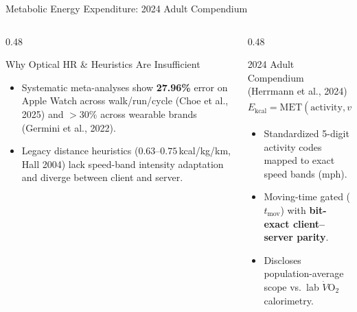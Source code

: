 \documentclass[aspectratio=169,10pt]{beamer}
\begin{document}
\begin{frame}{Metabolic Energy Expenditure: 2024 Adult Compendium}
  \begin{columns}[T]
    \begin{column}{0.48\textwidth}
      \begin{alertblock}{Why Optical HR \& Heuristics Are Insufficient}
        \begin{itemize}\small
          \item Systematic meta-analyses show \textbf{27.96\%} error on Apple Watch across walk/run/cycle (Choe et al., 2025) and \textbf{$>30\%$} across wearable brands (Germini et al., 2022).
          \item Legacy distance heuristics ($0.63$--$0.75$\,kcal/kg/km, Hall 2004) lack speed-band intensity adaptation and diverge between client and server.
        \end{itemize}
      \end{alertblock}
    \end{column}
    \begin{column}{0.48\textwidth}
      \begin{exampleblock}{2024 Adult Compendium (Herrmann et al., 2024)}
        \[
          E_{\text{kcal}} = \text{MET}(\text{activity}, v_{\text{mph}}) \times W_{\text{kg}} \times \frac{t_{\text{mov}}}{3600}
        \]
        \begin{itemize}\small
          \item Standardized 5-digit activity codes mapped to exact speed bands (mph).
          \item Moving-time gated ($t_{\text{mov}}$) with \textbf{bit-exact client--server parity}.
          \item Discloses population-average scope vs.\ lab $\dot{V}\text{O}_2$ calorimetry.
        \end{itemize}
      \end{exampleblock}
    \end{column}
  \end{columns}
\end{frame}
\end{document}
